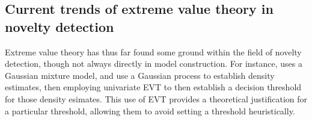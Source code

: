 \subsection{Current trends of extreme value theory in novelty detection}
Extreme value theory has thus far found some ground within the field of novelty 
    detection, though not always directly in model construction.  For instance,
    \cite{clifton2011} uses a Gaussian mixture model, and \cite{gu2021} use a
    Gaussian process to establish density estimates, then employing univariate 
    EVT to then establish a decision threshold for those density esimates.  This 
    use of EVT provides a theoretical  justification for a particular threshold, 
    allowing them to avoid setting a threshold heuristically.
    
    
